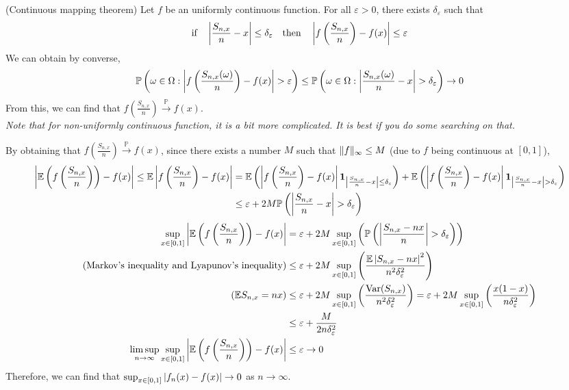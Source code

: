 \documentclass{huhtakm-template-book}
\newcommand{\prob}{\mathbb{P}}
\newcommand{\expect}{\mathbb{E}}
\DeclareMathOperator{\Var}{Var}
\begin{document}
\begin{rem}(Continuous mapping theorem)
    Let $f$ be an uniformly continuous function. For all $\varepsilon>0$, there exists $\delta_{\varepsilon}$ such that
    \begin{equation*}
        \text{if}\quad\left|{\frac{S_{n,x}}{n}-x}\right|\leq\delta_{\varepsilon}\quad\text{then}\quad\left|{f\left(\frac{S_{n,x}}{n}\right)-f(x)}\right|\leq\varepsilon
    \end{equation*}
    We can obtain by converse,
    \begin{equation*}
        \prob\left(\omega\in\Omega:\abs{f\left(\frac{S_{n,x}(\omega)}{n}\right)-f(x)}>\varepsilon\right)\leq\prob\left(\omega\in\Omega:\abs{\frac{S_{n,x}(\omega)}{n}-x}>\delta_{\varepsilon}\right)\to 0
    \end{equation*}
    From this, we can find that $f\left(\frac{S_{n,x}}{n}\right)\xrightarrow{\prob}f(x)$.\\
    \textit{Note that for non-uniformly continuous function, it is a bit more complicated. It is best if you do some searching on that.}
\end{rem}
\newpage
\begin{eg}
    By obtaining that $f\left(\frac{S_{n,x}}{n}\right)\xrightarrow{\prob}f(x)$, since there exists a number $M$ such that $\lVert{f}\rVert_{\infty}\leq M$ (due to $f$ being continuous at $[0,1]$),
    \begin{align*}
        \abs{\expect\left(f\left(\frac{S_{n,x}}{n}\right)\right)-f(x)}\leq\expect\abs{f\left(\frac{S_{n,x}}{n}\right)-f(x)}&=\expect\left(\abs{f\left(\frac{S_{n,x}}{n}\right)-f(x)}\mathbf{1}_{\abs{\frac{S_{n,x}}{n}-x}\leq\delta_{\varepsilon}}\right)+\expect\left(\abs{f\left(\frac{S_{n,x}}{n}\right)-f(x)}\mathbf{1}_{\abs{\frac{S_{n,x}}{n}-x}>\delta_{\varepsilon}}\right)\\
        &\leq\varepsilon+2M\prob\left(\abs{\frac{S_{n,x}}{n}-x}>\delta_{\varepsilon}\right)
    \end{align*}
    \begin{align*}
        \sup_{x\in[0,1]}\abs{\expect\left(f\left(\frac{S_{n,x}}{n}\right)\right)-f(x)}&=\varepsilon+2M\sup_{x\in [0,1]}\left(\prob\left(\abs{\frac{S_{n,x}-nx}{n}}>\delta_{\varepsilon}\right)\right)\\
        \tag{Markov's inequality and Lyapunov's inequality}
        &\leq\varepsilon+2M\sup_{x\in[0,1]}\left(\frac{\expect\abs{S_{n,x}-nx}^{2}}{n^{2}\delta_{\varepsilon}^{2}}\right)\\
        \tag{$\expect S_{n,x}=nx$}
        &\leq\varepsilon+2M\sup_{x\in[0,1]}\left(\frac{\Var(S_{n,x})}{n^{2}\delta_{\varepsilon}^{2}}\right)=\varepsilon+2M\sup_{x\in[0,1]}\left(\frac{x(1-x)}{n\delta_{\varepsilon}^{2}}\right)\\
        &\leq\varepsilon+\frac{M}{2n\delta_{\varepsilon}^{2}}\\
        \limsup_{n\to\infty}\sup_{x\in[0,1]}\abs{\expect\left(f\left(\frac{S_{n,x}}{n}\right)\right)-f(x)}&\leq\varepsilon\to 0
    \end{align*}
    Therefore, we can find that $\sup_{x\in[0,1]}\left|{f_{n}(x)-f(x)}\right|\to 0$ as $n\to\infty$.
\end{eg}
\end{document}
